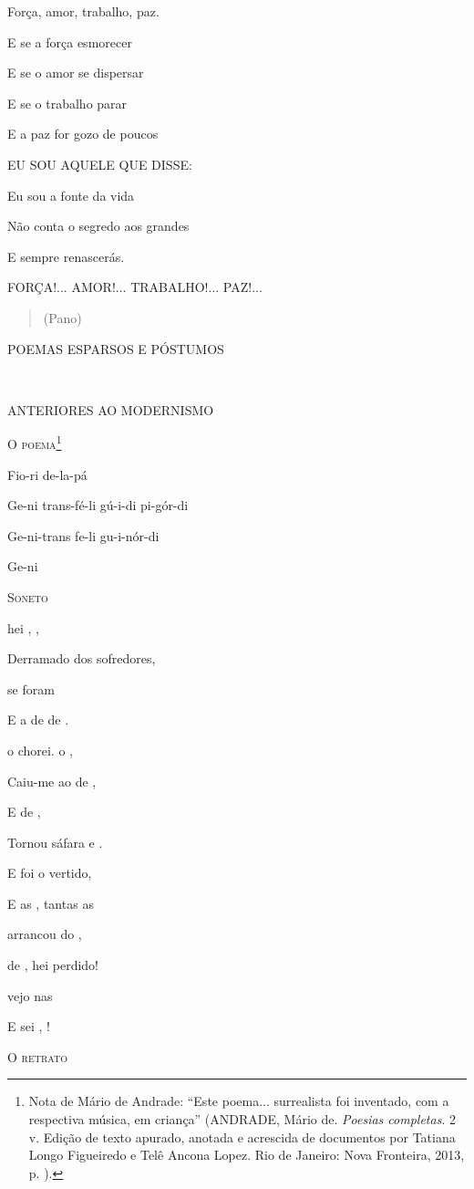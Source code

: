 Força, amor, trabalho, paz.

E se a força esmorecer

E se o amor se dispersar

E se o trabalho parar

E a paz for gozo de poucos

EU SOU AQUELE QUE DISSE:

Eu sou a fonte da vida

Não conta o segredo aos grandes

E sempre renascerás.

FORÇA!... AMOR!... TRABALHO!... PAZ!...

\begin{quote}
(Pano)
\end{quote}

\textsc{POEMAS ESPARSOS E PÓSTUMOS}

\textsc{\\
}

\textsc{ANTERIORES AO MODERNISMO}

\textsc{O poema}\footnote{Nota de Mário de Andrade: ``Este poema...
  surrealista foi inventado, com a respectiva música, em criança''
  (ANDRADE, Mário de. \emph{Poesias completas}. 2 v. Edição de texto
  apurado, anotada e acrescida de documentos por Tatiana Longo
  Figueiredo e Telê Ancona Lopez. Rio de Janeiro: Nova Fronteira, 2013,
  p. ).}

Fio-ri de-la-pá

Ge-ni trans-fé-li gú-i-di pi-gór-di

Ge-ni-trans fe-li gu-i-nór-di

Ge-ni

\textsc{Soneto}

hei , ,

Derramado dos sofredores,

se foram

E a de de .

o chorei. o ,

Caiu-me ao de ,

E de ,

Tornou sáfara e .

E foi o vertido,

E as , tantas as

arrancou do ,

de , hei perdido!

vejo nas

E sei , !

\textsc{O retrato}

